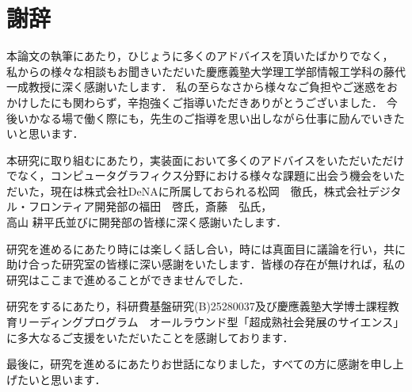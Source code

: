 \chapter*{謝辞}
\label{chap:thanks}
%
%
本論文の執筆にあたり，ひじょうに多くのアドバイスを頂いたばかりでなく，
私からの様々な相談もお聞きいただいた慶應義塾大学理工学部情報工学科の藤代 一成教授に深く感謝いたします．
私の至らなさから様々なご負担やご迷惑をおかけしたにも関わらず，辛抱強くご指導いただきありがとうございました．
今後いかなる場で働く際にも，先生のご指導を思い出しながら仕事に励んでいきたいと思います．\\
\par
本研究に取り組むにあたり，実装面において多くのアドバイスをいただいただけでなく，コンピュータグラフィクス分野における様々な課題に出会う機会をいただいた，現在は株式会社DeNAに所属しておられる松岡　徹氏，株式会社デジタル・フロンティア開発部の福田　啓氏，斎藤　弘氏，\\高山 耕平氏並びに開発部の皆様に深く感謝いたします．\\
\par
研究を進めるにあたり時には楽しく話し合い，時には真面目に議論を行い，共に助け合った研究室の皆様に深い感謝をいたします．皆様の存在が無ければ，私の研究はここまで進めることができませんでした．\\
\par
研究をするにあたり，科研費基盤研究(B)25280037及び慶應義塾大学博士課程教育リーディングプログラム　オールラウンド型「超成熟社会発展のサイエンス」に多大なるご支援をいただいたことを感謝しております．\\
\par
最後に，研究を進めるにあたりお世話になりました，すべての方に感謝を申し上げたいと思います．